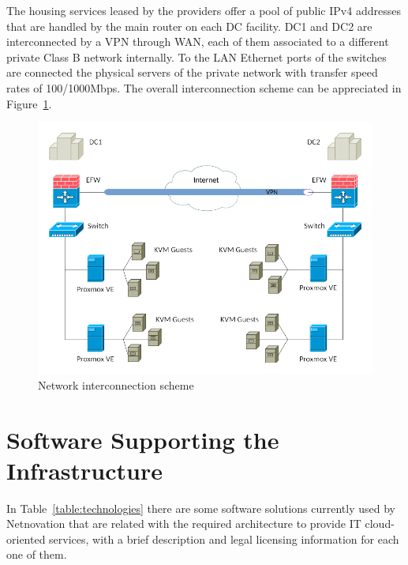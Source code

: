 \documentclass[a4paper, 12pt]{book}
\begin{document}
The housing services leased by the providers offer a pool of public IPv4 addresses that are handled by the main router on each DC facility. DC1 and DC2 are interconnected by a VPN through WAN, each of them associated to a different private Class B network internally. To the LAN Ethernet ports of the switches are connected the physical servers of the private network with transfer speed rates of 100/1000Mbps. The overall interconnection scheme can be appreciated in Figure~\ref{fig:network}.

\begin{figure}[H]
  \centering
  \includegraphics[scale=0.50]{network_scheme.png}
  \caption[Network interconnection scheme]{Network interconnection scheme}
  \label{fig:network}
\end{figure}


\section{Software Supporting the Infrastructure}
\label{sec:software}

In Table~\ref{table:technologies} there are some software solutions currently used by Netnovation that are related with the required architecture to provide IT cloud-oriented services, with a brief description and legal licensing information for each one of them.
\end{document}
